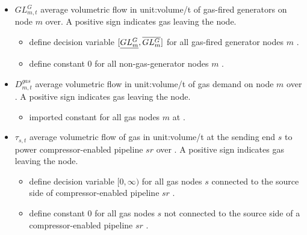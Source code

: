 \begin{itemize}
\item $GL^G_{m,t}$ average volumetric flow in \gls{unit:volume/t} of gas-fired
generators on node $m$ over\intervaloft{}. A positive sign indicates gas leaving
  the node.  \begin{itemize} \item \gls{define} decision variable
  $[\underline{GL^G_m}, \overline{GL^G_m}]$ for all gas-fired generator nodes
  $m$ \atallt{}.  \item \gls{define} constant $0$ for all non-gas-generator
  nodes $m$ \atallt{}.  \end{itemize}

\item $D^{gas}_{m,t}$ average volumetric flow in \gls{unit:volume/t} of gas demand
on node $m$ over \intervaloft{}. A positive sign indicates gas leaving the
  node.  \begin{itemize} \item \gls{imported} constant for all gas nodes $m$
  at \atallt{}.  \end{itemize}

\item $\tau_{s,t}$ average volumetric flow of gas in \gls{unit:volume/t}
at the sending end $s$ to power compressor-enabled pipeline $sr$
  over \intervaloft{}. A positive sign indicates gas leaving the
  node.  \begin{itemize} \item \gls{define}{} decision variable $[0, \infty)$
  for all gas nodes $s$ connected to the source side of compressor-enabled
  pipeline $sr$ \atallt{}.

  \item \gls{define}{} constant $0$ for all gas nodes $s$ not connected to the
    source side of a compressor-enabled pipeline $sr$ \atallt{}.  \end{itemize}


\end{itemize}
